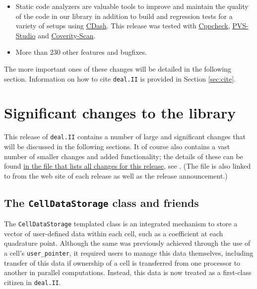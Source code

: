 \documentclass{ansarticle-preprint}
\newcommand{\specialword}[1]{\texttt{#1}}
\newcommand{\dealii}{{\specialword{deal.II}}}
\begin{document}
\begin{itemize}
\item Static code analyzers are valuable tools to improve
  and maintain the quality of the code in our library in addition to build and
  regression tests for a variety of setups using
  \href{https://cdash.kyomu.43-1.org/index.php?project=deal.II}{CDash}.
  This release was tested with
  \href{http://cppcheck.sourceforge.net/}{Cppcheck},
  \href{https://www.viva64.com/en/pvs-studio/}{PVS-Studio} and
  \href{https://scan.coverity.com/}{Coverity-Scan}.

  \item More than 230 other features and bugfixes.
\end{itemize}
The more important ones of these changes will be detailed in the
following section.  Information on how to cite \dealii{} is provided
in Section \ref{sec:cite}.



\section{Significant changes to the library}

This release of \dealii{} contains a number of large and significant changes
that will be discussed in the following sections. It of course also contains a
vast number of smaller changes and added functionality; the details of these
can be found
\href{https://www.dealii.org/8.5.0/doxygen/deal.II/changes_between_8_4_and_8_5.html}{in
the file that lists all changes for this release}, see \cite{changes85}.
(The file is also linked to from the web site of each release as well as
the release announcement.)


\subsection{The \texttt{CellDataStorage} class and friends}

The \texttt{CellDataStorage} templated class is an integrated mechanism to
store a vector of user-defined data within each cell,
such as a coefficient at each quadrature point.
Although the same was previously achieved through the use
of a cell's \texttt{user\_pointer}, it required users to manage this data
themselves, including transfer of this data if ownership of a cell is
transferred from one processor to another in parallel
computations. Instead, this data is now treated as a first-class
citizen in \dealii{}.
\end{document}
